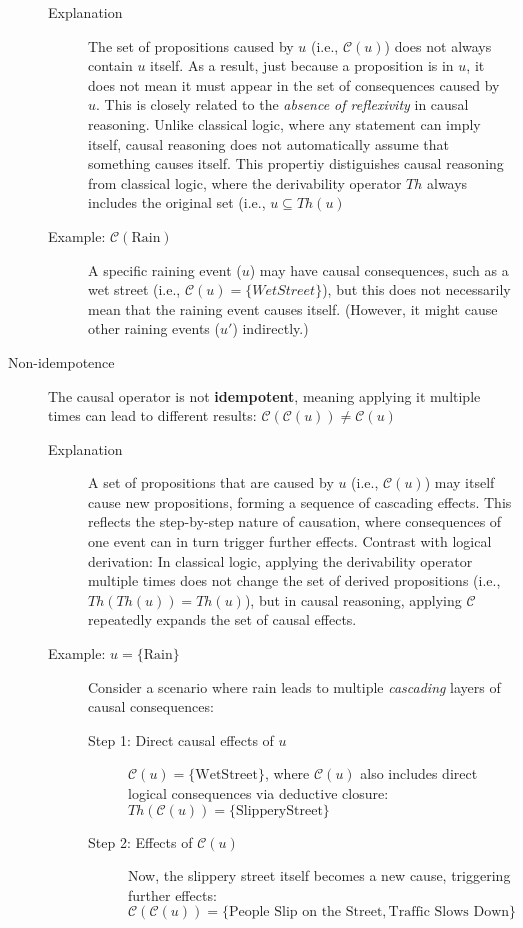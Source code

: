 \documentclass[seminar,palatino,english]{AIGpaper}
\begin{document}
\begin{description}
    \begin{description}  
        \item[Explanation] The set of propositions caused by $ u $ (i.e., $ \mathcal{C}(u) $) does not always contain $ u $ itself. As a result, just because a proposition is in $ u $, it does not mean it must appear in the set of consequences caused by $ u $. This is closely related to the \emph{absence of reflexivity} in causal reasoning. Unlike classical logic, where any statement can imply itself, causal reasoning does not automatically assume that something causes itself. This propertiy distiguishes causal reasoning from classical logic, where the derivability operator $ Th $ always includes the original set (i.e., $ u \subseteq Th(u) $
        \item[Example: $ \mathcal{C}(\text{Rain}) $]  
        A specific raining event ($ u $) may have causal consequences, such as a wet street (i.e., $ \mathcal{C}(u) = \{ WetStreet \}$), but this does not necessarily mean that the raining event causes itself. (However, it might cause other raining events ($ u' $) indirectly.)
    \end{description}
    \item[Non-idempotence] The causal operator is not \textbf{idempotent}, meaning applying it multiple times can lead to different results: $ \mathcal{C}(\mathcal{C}(u)) \neq \mathcal{C}(u) $
    \begin{description}
        \item[Explanation]  
        A set of propositions that are caused by $ u $ (i.e., $ \mathcal{C}(u) $) may itself cause new propositions, \glqq{}forming a sequence of cascading effects\grqq{}\cite{bochman_logical_2021}. This reflects the step-by-step nature of causation, where consequences of one event can in turn trigger further effects. Contrast with logical derivation: In classical logic, applying the derivability operator multiple times does not change the set of derived propositions (i.e., $ Th(Th(u)) = Th(u) $), but in causal reasoning, applying $ \mathcal{C} $ repeatedly expands the set of causal effects.  
        \item[Example: $ u = \{\text{Rain}\} $]  
        Consider a scenario where rain leads to multiple \textit{cascading} layers of causal consequences:  
        \begin{description}
            \item[Step 1: Direct causal effects of $ u $] $\mathcal{C}(u) = \{\text{WetStreet}\} $, where $\mathcal{C}(u)$ also includes direct logical consequences via deductive closure:  $ Th(\mathcal{C}(u)) = \{\text{SlipperyStreet}\} $        
            \item[Step 2: Effects of $ \mathcal{C}(u) $]  
            Now, the slippery street itself becomes a new cause, triggering further effects:  
            $
            \mathcal{C}(\mathcal{C}(u)) = \{\text{People Slip on the Street}, \text{Traffic Slows Down}\}
            $
            

\end{description}
\end{description}
\end{description}
\end{document}
